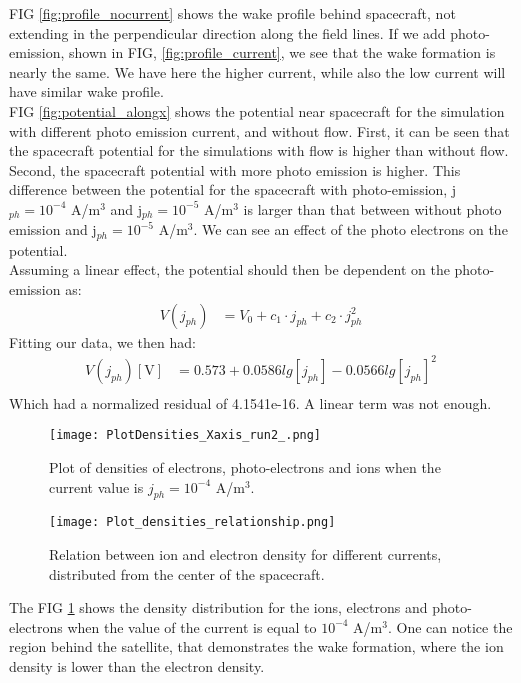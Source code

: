 \documentclass[aip, 
rsi, 
amsmath,
amssymb,
longbibliography,
preprint]{revtex4-1}
\begin{document}
FIG \ref{fig:profile_nocurrent} shows the wake profile behind spacecraft, not extending in the perpendicular direction along the field lines. If we add photo-emission,  shown in FIG, \ref{fig:profile_current}, we see that the wake formation is nearly the same. We have here the higher current, while also the low current will have similar wake profile.\\

FIG \ref{fig:potential_alongx} shows the potential near spacecraft for the simulation with different photo emission current, and without flow. First, it can be seen that the spacecraft potential for the simulations with flow is higher than without flow. Second, the spacecraft potential with more photo emission is higher. This difference between the potential for the spacecraft  with photo-emission, j$_{ph} = 10^{-4}$ A/m$^3$ and  j$_{ph} = 10^{-5}$ A/m$^3$ is larger than that between without photo emission and  j$_{ph} = 10^{-5}$ A/m$^3$. We can see an effect of the photo electrons on the potential.\\

Assuming a linear effect, the potential should then be dependent on the photo-emission as:
\begin{align*}
V\left(j_{ph}\right) &= V_0 + c_1\cdot j_{ph} + c_2\cdot j_{ph}^2
\end{align*}
Fitting our data, we then had:
\begin{align*}
V\left(j_{ph}\right) \left[\text{V}\right]&= 0.573 + 0.0586 lg\left[j_{ph}\right] - 0.0566 lg\left[j_{ph}\right]^2\\
\end{align*}
Which had a normalized residual of 4.1541e-16. A linear term was not enough.\\

\begin{figure}
\texttt{[image: PlotDensities\_Xaxis\_run2\_.png]}
\caption{\label{fig:densityCurrent}Plot of densities of electrons, photo-electrons and ions when the current value is \(j_{ph} = 10^{-4}\) A/m$^3$.}
\end{figure}

\begin{figure}
\texttt{[image: Plot\_densities\_relationship.png]}
\caption{\label{fig:densityCurrentRelation}Relation between ion and electron density for different currents, distributed from the center of the spacecraft.}
\end{figure}

The FIG \ref{fig:densityCurrent} shows the density distribution for the ions, electrons and photo-electrons when the value of the current is equal to $10^{-4}$ A/m$^3$. One can notice the region behind the satellite, that demonstrates the wake formation, where the ion density is lower than the electron density.\par
\end{document}
